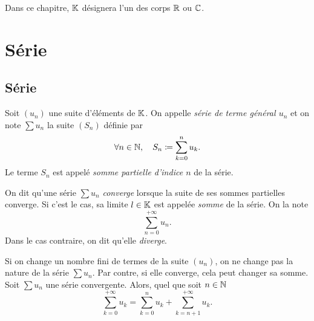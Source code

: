 \documentclass{magnolia}
\begin{document}


\magtoc
\vspace{2ex}
Dans ce chapitre, $\mathbb{K}$ désignera l'un des corps $\mathbb{R}$ ou $\mathbb{C}$.

\section{Série}
\subsection{Série}

\begin{definition}
Soit $(u_n)$ une suite d'éléments de $\mathbb{K}$. On appelle \emph{série de terme général $u_n$}
et on note $\sum u_n$ la suite $(S_n)$ définie par
\[\forall n\in\mathbb{N},\quad S_n\coloneqq \sum_{k=0}^n u_k.\]
Le terme $S_n$ est appelé \emph{somme partielle d'indice $n$} de la série.
\end{definition}


\begin{definition}
On dit qu'une série $\sum u_n$ \emph{converge} lorsque la suite de ses sommes partielles
converge. Si c'est le cas, sa limite $l\in\mathbb{K}$ est appelée \emph{somme} de la série. On
la note
\[\sum_{n=0}^{+\infty} u_n.\]
Dans le cas contraire, on dit qu'elle \emph{diverge}.
\end{definition}

\begin{remarques}
\remarque Si on change un nombre fini de termes de la suite $(u_n)$, on ne change pas
  la nature de la série $\sum u_n$. Par contre, si elle converge, cela peut changer sa somme.
\remarque Soit $\sum u_n$ une série convergente. Alors, quel que soit $n\in\mathbb{N}$
  \[\sum_{k=0}^{+\infty} u_k=\sum_{k=0}^n u_k + \sum_{k=n+1}^{+\infty} u_k.\]
\end{remarques}
\end{document}
